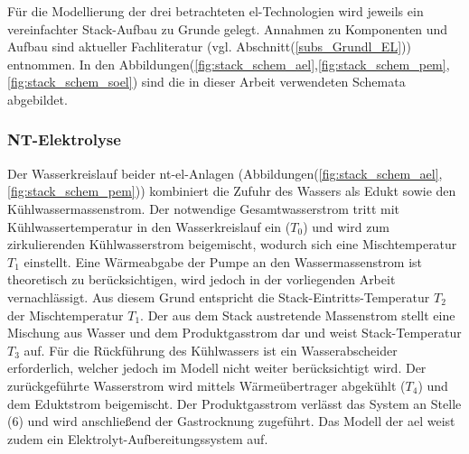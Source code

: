 \documentclass[onecolumn,10pt,titlepage]{article}
\begin{document}
%	
Für die Modellierung der drei betrachteten \gls{el}-Technologien wird jeweils ein vereinfachter Stack-Aufbau zu Grunde gelegt. Annahmen zu Komponenten und Aufbau sind aktueller Fachliteratur (vgl. Abschnitt(\ref{subs_Grundl_EL})) entnommen. In den Abbildungen(\ref{fig:stack_schem_ael},\ref{fig:stack_schem_pem},\ref{fig:stack_schem_soel}) sind die in dieser Arbeit verwendeten Schemata abgebildet.\\
\subsubsection{NT-Elektrolyse}
\label{subsubs_peri_schem_NT}
Der Wasserkreislauf beider \gls{nt}-\gls{el}-Anlagen (Abbildungen(\ref{fig:stack_schem_ael},\ref{fig:stack_schem_pem})) kombiniert die Zufuhr des Wassers als Edukt sowie den Kühlwassermassenstrom. Der notwendige Gesamtwasserstrom tritt mit Kühlwassertemperatur  in den Wasserkreislauf ein ($T_0$) und wird zum zirkulierenden Kühlwasserstrom beigemischt, wodurch sich eine Mischtemperatur $T_1$ einstellt. Eine Wärmeabgabe der Pumpe an den Wassermassenstrom ist theoretisch zu berücksichtigen, wird jedoch in der vorliegenden Arbeit vernachlässigt. Aus diesem Grund entspricht die Stack-Eintritts-Temperatur $T_2$ der Mischtemperatur $T_1$. Der aus dem Stack austretende Massenstrom stellt eine Mischung aus Wasser und dem Produktgasstrom dar und weist Stack-Temperatur $T_3$ auf. Für die Rückführung des Kühlwassers ist ein Wasserabscheider erforderlich, welcher jedoch im Modell nicht weiter berücksichtigt wird. Der zurückgeführte Wasserstrom wird mittels Wärmeübertrager abgekühlt ($T_4$) und dem Eduktstrom beigemischt. Der Produktgasstrom verlässt das System an Stelle (6) und wird anschließend der Gastrocknung zugeführt. Das Modell der \gls{ael} weist zudem ein Elektrolyt-Aufbereitungssystem auf.
\end{document}
